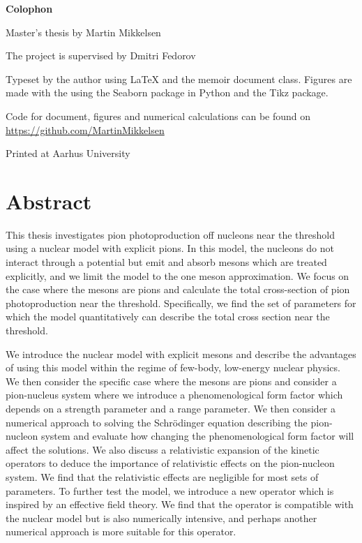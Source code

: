 
\edef\fontandleading{\@memptsize.0/\the\baselineskip}
\makeatother
\thispagestyle{empty}
\strut\vfill
{
	\setlength{\parindent}{0pt}
	\addtolength{\parskip}{.6em}
	
	\begin{center}
		\bfseries\sffamily Colophon
	\end{center}
	
	\small
	
	\textsl{\projecttitle}
	
	\smallskip
	
	Master's thesis by Martin Mikkelsen
	
	The project is supervised by Dmitri Fedorov
	
	Typeset by the author using \LaTeX{} and the \textsf{memoir} document class. Figures are made with the using the Seaborn package in Python and the Tikz package.
	
	Code for document, figures and numerical calculations can be found on \url{https://github.com/MartinMikkelsen}
	
	Printed at Aarhus University
}
\frontmatter
\section*{Abstract}

This thesis investigates pion photoproduction off nucleons near the threshold using a nuclear model with explicit pions. In this model, the nucleons do not interact through a potential but emit and absorb mesons which are treated explicitly, and we limit the model to the one meson approximation. We focus on the case where the mesons are pions and calculate the total cross-section of pion photoproduction near the threshold. Specifically, we find the set of parameters for which the model quantitatively can describe the total cross section near the threshold. 

We introduce the nuclear model with explicit mesons and describe the advantages of using this model within the regime of few-body, low-energy nuclear physics. We then consider the specific case where the mesons are pions and consider a pion-nucleus system where we introduce a phenomenological form factor which depends on a strength parameter and a range parameter. We then consider a numerical approach to solving the Schrödinger equation describing the pion-nucleon system and evaluate how changing the phenomenological form factor will affect the solutions. We also discuss a relativistic expansion of the kinetic operators to deduce the importance of relativistic effects on the pion-nucleon system. We find that the relativistic effects are negligible for most sets of parameters. To further test the model, we introduce a new operator which is inspired by an effective field theory. We find that the operator is compatible with the nuclear model but is also numerically intensive, and perhaps another numerical approach is more suitable for this operator.

